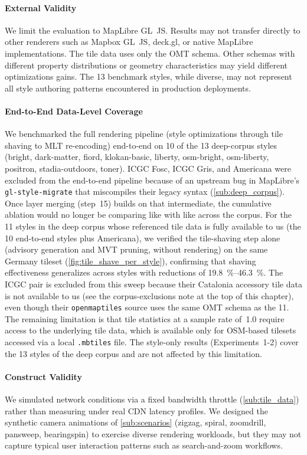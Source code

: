 \paragraph{External Validity}
We limit the evaluation to MapLibre GL~JS.
Results may not transfer directly to other renderers such as Mapbox GL~JS, deck.gl, or native MapLibre implementations.
The tile data uses only the \ac{OMT} schema.
Other schemas with different property distributions or geometry characteristics may yield different optimizations gains.
The 13 benchmark styles, while diverse, may not represent all style authoring patterns encountered in production deployments.

\paragraph{End-to-End Data-Level Coverage}
We benchmarked the full rendering pipeline (style optimizations through tile shaving to \ac{MLT} re-encoding) end-to-end on 10 of the 13 deep-corpus styles (bright, dark-matter, fiord, klokan-basic, liberty, osm-bright, osm-liberty, positron, stadia-outdoors, toner).
ICGC Fosc, ICGC Gris, and Americana were excluded from the end-to-end pipeline because of an upstream bug in MapLibre's \texttt{gl-style-migrate} that miscompiles their legacy  syntax (\cref{sub:deep_corpus}).
Once layer merging (step~15) builds on that intermediate, the cumulative ablation would no longer be comparing like with like across the corpus.
For the 11 styles in the deep corpus whose referenced tile data is fully available to us (the 10 end-to-end styles plus Americana), we verified the tile-shaving step alone (advisory generation and \ac{MVT} pruning, without rendering) on the same Germany tileset (\cref{fig:tile_shave_per_style}), confirming that shaving effectiveness generalizes across styles with reductions of \qtyrange{19.8}{46.3}{\percent}.
The ICGC pair is excluded from this sweep because their Catalonia accessory tile data is not available to us (see the corpus-exclusions note at the top of this chapter), even though their \texttt{openmaptiles} source uses the same OMT schema as the 11.
The remaining limitation is that tile statistics at a sample rate of~1.0 require access to the underlying tile data, which is available only for \ac{OSM}-based tilesets accessed via a local \texttt{.mbtiles} file.
The style-only results (Experiments~1-2) cover the 13 styles of the deep corpus and are not affected by this limitation.

\paragraph{Construct Validity}
We simulated network conditions via a fixed bandwidth throttle (\cref{sub:tile_data}) rather than measuring under real \ac{CDN} latency profiles.
We designed the synthetic camera animations of \cref{sub:scenarios} (zigzag, spiral, zoomdrill, pansweep, bearingspin) to exercise diverse rendering workloads, but they may not capture typical user interaction patterns such as search-and-zoom workflows.


